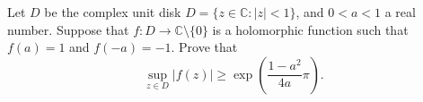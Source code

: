 Let $D$ be the complex unit disk $D=\{z \in \mathbb{C}: |z|<1\}$, and $0<a<1$ a real number. Suppose that $f:D \to \mathbb{C}\setminus \{0\}$ is a holomorphic function such that $f(a)=1$ and $f(-a)=-1$. Prove that
$$ \sup_{z \in D} |f(z)| \geqslant \exp\left(\frac{1-a^2}{4a}\pi\right) .$$